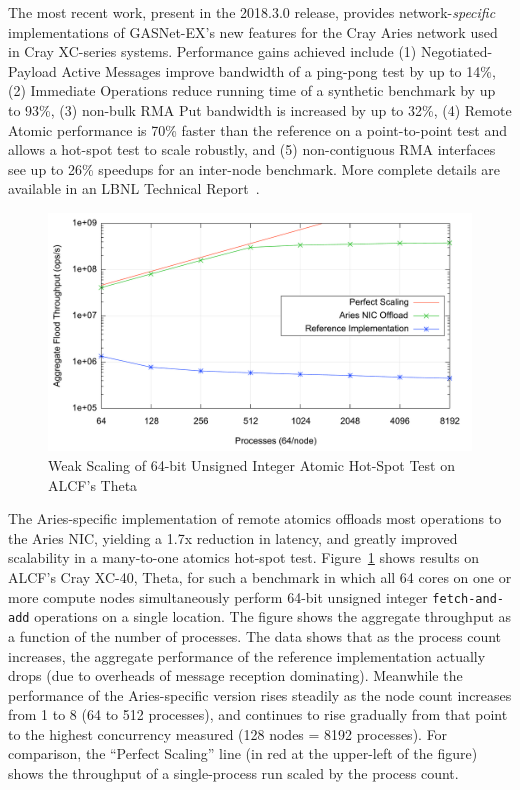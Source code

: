 The most recent work, present in the 2018.3.0 release, 
provides network-{\em specific} implementations of GASNet-EX's new features
for the Cray Aries network used in Cray XC-series systems.
Performance gains achieved include (1) Negotiated-Payload Active Messages improve
bandwidth of a ping-pong test by up to 14\%, (2) Immediate Operations reduce running time
of a synthetic benchmark by up to 93\%, (3) non-bulk RMA Put bandwidth is increased by up
to 32\%, (4) Remote Atomic performance is 70\% faster than the reference on a point-to-point
test and allows a hot-spot test to scale robustly, and (5) non-contiguous RMA interfaces
see up to 26\% speedups for an inter-node benchmark.  More complete details are
available in an LBNL Technical Report~\cite{gasnet-aries}.

\begin{figure}[htb]
  \centering
  \includegraphics[width=\textwidth]{projects/2.3.1-PMR/2.3.1.14-UPCxx-GASNet/aries-fadd.pdf}
  \caption{\label{fig:aries-fadd}
           Weak Scaling of 64-bit Unsigned Integer Atomic Hot-Spot Test on ALCF's Theta}
\end{figure}

The Aries-specific implementation of remote atomics offloads most operations to
the Aries NIC, yielding a 1.7x reduction in latency, and greatly improved
scalability in a many-to-one atomics hot-spot test.
Figure~\ref{fig:aries-fadd} shows results on ALCF's Cray XC-40, Theta, for such
a benchmark in which all 64 cores on one or more compute nodes simultaneously
perform 64-bit unsigned integer \texttt{fetch-and-add} operations on a single location.
The figure shows the aggregate throughput as a function of the number
of processes.  The data shows that as the process count increases, the aggregate
performance of the reference implementation actually drops (due to overheads of
message reception dominating).  Meanwhile the performance of the Aries-specific
version rises steadily as the node count increases from 1 to 8 (64 to 512
processes), and continues to rise gradually from that point to the highest
concurrency measured (128 nodes = 8192 processes).  For comparison, the
``Perfect Scaling'' line (in red at the upper-left of the figure) shows the
throughput of a single-process run scaled by the process count.

